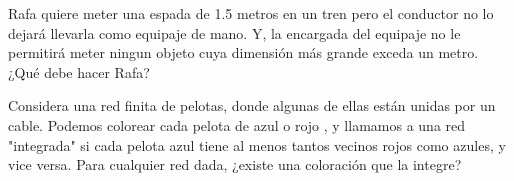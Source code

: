 \begin{problem}
    Rafa quiere meter una espada de 1.5 metros en un tren pero el conductor 
    no lo dejará llevarla como equipaje de mano. Y, 
    la encargada del equipaje no le permitirá meter ningun objeto 
    cuya dimensión más grande exceda un metro. ¿Qué debe hacer Rafa?
\end{problem}

\begin{problem}

    \rod

    Considera una red finita de pelotas, donde algunas de ellas 
    están unidas por un cable. Podemos colorear cada pelota de azul o 
    rojo , y llamamos a una red "integrada" si cada pelota azul 
    tiene al menos tantos vecinos rojos como azules, y vice versa. 
    Para cualquier red dada, ¿existe una coloración que la integre? 
\end{problem}